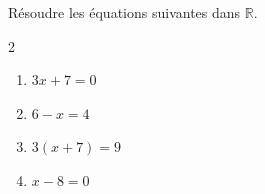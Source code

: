 \begin{exo}{}
	Résoudre les équations suivantes dans $\mathbb{R}$.

	\vspace*{-2mm}
	\begin{multicols}{2}
		\begin{enumerate}
			\item $3x + 7 = 0$
			\item $6 - x = 4$
			\item $3(x + 7) = 9$
			\item $x - 8 = 0$
		\end{enumerate}
	\end{multicols}
\end{exo}
